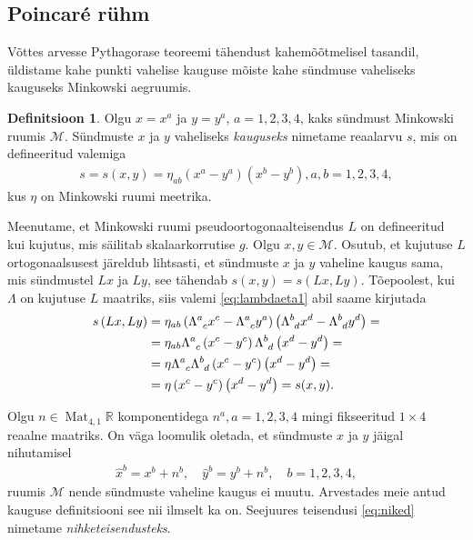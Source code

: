 \documentclass[12pt]{article}
\theoremstyle{plain}
\theoremstyle{definition}
\newtheorem{definitsioon}{Definitsioon}[section]
\numberwithin{equation}{section}
\def\R{{\mathbb R}}
\def\M{{\mathcal M}}
\DeclareMathOperator{\Mat}{Mat}
\begin{document}
\subsection{Poincar\'e rühm}

Võttes arvesse Pythagorase teoreemi tähendust kahemõõtmelisel 
tasandil, üldi\-stame 
kahe punkti vahelise kauguse mõiste kahe sündmuse vaheliseks 
kauguseks Minkowski aegruumis.

\begin{definitsioon}
Olgu $x = x^a$ ja $y = y^a$, $a = 1, 2, 3, 4$, kaks sündmust 
Minkowski ruumis $\M$. Sündmuste $x$ ja $y$ vaheliseks 
\emph{kauguseks} nimetame reaalarvu $s$, mis on defineeritud 
valemiga
\begin{align*}
s = s\left(x, y\right) = \eta_{ab} \left(x^a - y^a\right)
\left(x^b - y^b\right), a,b = 1, 2, 3, 4,
\end{align*}
kus $\eta$ on Minkowski ruumi meetrika.
\end{definitsioon}

Meenutame, et Minkowski ruumi pseudoortogonaalteisendus $L$ on 
defineeritud kui kujutus, mis säilitab skalaarkorrutise $g$. Olgu 
$x, y \in \M$. Osutub, et kujutuse $L$ ortogonaalsusest järeldub 
lihtsasti, et sündmuste $x$ ja $y$ vaheline kaugus sama, mis 
sündmustel $Lx$ ja $Ly$, see tähendab $s\left(x, y\right) = 
s\left(Lx, Ly\right)$. Tõepoolest, kui $\Lambda$ on kujutuse $L$ 
maatriks, siis valemi \ref{eq:lambdaeta1} abil saame kirjutada
\begin{align*}
s\left(Lx, Ly\right) &= \eta_{ab} \left(\Lambda\indices{^a_c} x^c - 
	\Lambda\indices{^a_c} y^a\right) \left(\Lambda\indices{^b_d} 
	x^d - \Lambda\indices{^b_d} y^d\right) = \\
&= \eta_{ab} \Lambda\indices{^a_c} \left(x^c - y^c\right) 
	\Lambda\indices{^b_d} \left(x^d - y^d\right) = \\
&= \eta \Lambda\indices{^a_c} \Lambda\indices{^b_d} 
	\left(x^c - y^c\right) \left(x^d - y^d\right) = \\
&= \eta \left(x^c - y^c\right) \left(x^d - y^d\right) = s(x, y).
\end{align*}

Olgu $n \in \Mat_{4, 1} \R$ komponentidega $n^a, a = 1, 2, 3, 4$ 
mingi fikseeritud $1 \times 4$ reaalne maatriks. On väga loomulik 
oletada, et sündmuste $x$ ja $y$ jäigal nihutamisel
\begin{align} \label{eq:niked}
\hat{x}^b = x^b + n^b, \quad \hat{y}^b = y^b + n^b, \quad 
b = 1, 2, 3, 4,
\end{align}
ruumis $\M$ nende sündmuste vaheline kaugus ei muutu. Arvestades 
meie antud kauguse definitsiooni see nii ilmselt ka on. Seejuures 
teisendusi \ref{eq:niked} nimetame \emph{nihketeisendusteks}.
\end{document}
